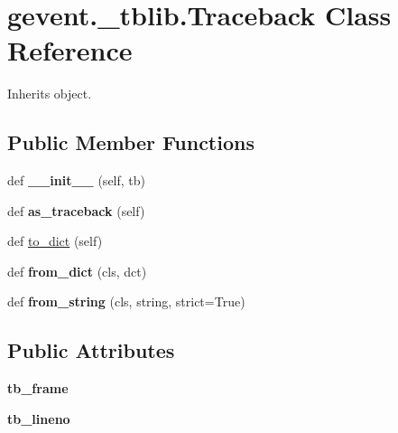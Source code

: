 \hypertarget{classgevent_1_1__tblib_1_1_traceback}{}\section{gevent.\+\_\+tblib.\+Traceback Class Reference}
\label{classgevent_1_1__tblib_1_1_traceback}


Inherits object.

\subsection*{Public Member Functions}
\begin{DoxyCompactItemize}
\item 
\mbox{\label{classgevent_1_1__tblib_1_1_traceback_a4c059d8138c3a0c539edeed2a57ae466}} 
def {\bfseries \+\_\+\+\_\+init\+\_\+\+\_\+} (self, tb)
\item 
\mbox{\label{classgevent_1_1__tblib_1_1_traceback_abfae220f77382a3d8d541b5aa29c65a8}} 
def {\bfseries as\+\_\+traceback} (self)
\item 
def \hyperlink{classgevent_1_1__tblib_1_1_traceback_aeada2e87f56ed4cc3de57afb34049ad5}{to\+\_\+dict} (self)
\item 
\mbox{\label{classgevent_1_1__tblib_1_1_traceback_a9e4c7bb848720a274447a80e0f839553}} 
def {\bfseries from\+\_\+dict} (cls, dct)
\item 
\mbox{\label{classgevent_1_1__tblib_1_1_traceback_ad5cd9f869c73ec2416b69a645eb0b0b1}} 
def {\bfseries from\+\_\+string} (cls, string, strict=True)
\end{DoxyCompactItemize}
\subsection*{Public Attributes}
\begin{DoxyCompactItemize}
\item 
\mbox{\label{classgevent_1_1__tblib_1_1_traceback_a9a5995082d676a0ef1da7fda6ae56160}} 
{\bfseries tb\+\_\+frame}
\item 
\mbox{\label{classgevent_1_1__tblib_1_1_traceback_a1af5b60b687909adde9db44fde3a8851}} 
{\bfseries tb\+\_\+lineno}
\end{DoxyCompactItemize}
